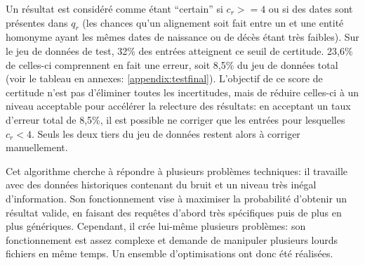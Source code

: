 \bigskip
Un résultat est considéré comme étant \enquote{certain} si \(c_{r} >= 4\) ou si des dates sont présentes dans \(q_r\) (les chances qu'un alignement soit fait entre un \tname{} et une entité homonyme ayant les mêmes dates de naissance ou de décès étant très faibles). Sur le jeu de données de test, 32\% des entrées atteignent ce seuil de certitude. 23,6\% de celles-ci comprennent en fait une erreur, soit 8,5\% du jeu de données total (voir le tableau en annexes: \ref{appendix:testfinal}). L'objectif de ce score de certitude n'est pas d'éliminer toutes les incertitudes, mais de réduire celles-ci à un niveau acceptable pour accélérer la relecture des résultats: en acceptant un taux d'erreur total de 8,5\%, il est possible ne corriger que les entrées pour lesquelles \(c_r < 4\). Seuls les deux tiers du jeu de données restent alors à corriger manuellement.

Cet algorithme cherche à répondre à plusieurs problèmes techniques: il travaille avec des données historiques contenant du bruit et un niveau très inégal d'information. Son fonctionnement vise à maximiser la probabilité d'obtenir un résultat valide, en faisant des requêtes d'abord très spécifiques puis de plus en plus génériques. Cependant, il crée lui-même plusieurs problèmes: son fonctionnement est assez complexe et demande de manipuler plusieurs lourds fichiers en même temps. Un ensemble d'optimisations ont donc été réalisées.

